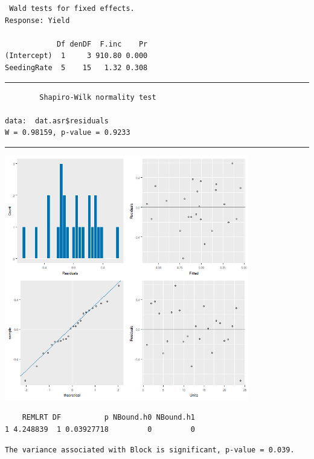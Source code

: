 \documentclass[a4paper, 10pt, fleqn, twosided]{memoir}
\begin{document}
\begin{tcolorbox}[title = Exercise 10 output]
\begin{verbatim}
 Wald tests for fixed effects.
Response: Yield

            Df denDF  F.inc    Pr
(Intercept)  1     3 910.80 0.000
SeedingRate  5    15   1.32 0.308

\end{verbatim}
{\color{outpt} {\hrule height 1pt}}
\begin{verbatim}
        Shapiro-Wilk normality test

data:  dat.asr$residuals
W = 0.98159, p-value = 0.9233
\end{verbatim}
{\color{outpt} {\hrule height 1pt}} \vspace{0.2cm}

\includegraphics[width=0.8\textwidth, frame]{Exercise10Resplot.png}
\end{tcolorbox}
\begin{tcolorbox}[title = Exercise 10 output]
\begin{verbatim}
    REMLRT DF          p NBound.h0 NBound.h1
1 4.248839  1 0.03927718         0         0
\end{verbatim}
\end{tcolorbox}


\begin{tcolorbox}[title = Exercise 10 interpretation]
\begin{verbatim}
The variance associated with Block is significant, p-value = 0.039.
\end{verbatim}
\end{tcolorbox}
\end{document}
